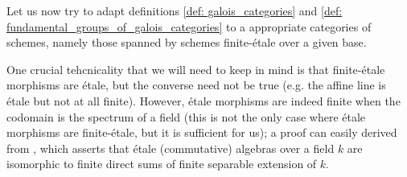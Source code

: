             Let us now try to adapt definitions \ref{def: galois_categories} and \ref{def: fundamental_groups_of_galois_categories} to a appropriate categories of schemes, namely those spanned by schemes finite-\'etale over a given base.
            \begin{remark} \label{remark: etale_vs_finite_etale}
                One crucial tehcnicality that we will need to keep in mind is that finite-\'etale morphisms are \'etale, but the converse need not be true (e.g. the affine line is \'etale but not at all finite). However, \'etale morphisms are indeed finite when the codomain is the spectrum of a field (this is not the only case where \'etale morphisms are finite-\'etale, but it is sufficient for us); a proof can easily derived from \cite[\href{https://stacks.math.columbia.edu/tag/00U3}{Tag 00U3}]{stacks}, which asserts that \'etale (commutative) algebras over a field $k$ are isomorphic to finite direct sums of finite separable extension of $k$. 
            \end{remark}
